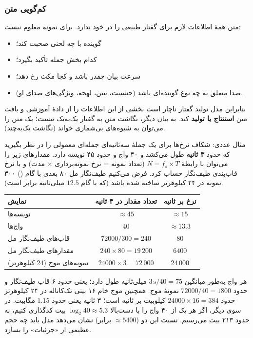 \subsubsection{کم‌گویی متن}
متن همهٔ اطلاعات لازم برای گفتار طبیعی را در خود ندارد. برای نمونه معلوم نیست:
\begin{itemize}
  \item گوینده با چه لحنی صحبت کند؛
  \item کدام بخش جمله تأکید بگیرد؛
  \item سرعت بیان چقدر باشد و کجا مکث رخ دهد؛
  \item صدا متعلق به چه نوع گوینده‌ای باشد (جنسیت، سن، لهجه، ویژگی‌های صدای او).
\end{itemize}
بنابراین مدل تولید گفتار ناچار است بخشی از این اطلاعات را از دادهٔ آموزشی و بافت متن \textbf{استنتاج یا تولید} کند. به بیان دیگر، نگاشت متن به گفتار یک‌به‌یک نیست؛ یک متن را می‌توان به شیوه‌های بی‌شماری خواند (نگاشت یک‌به‌چند).

\begin{addedbox}{مثال عددی: شکاف نرخ‌ها برای یک جملهٔ سه‌ثانیه‌ای}
جمله‌ای معمولی را در نظر بگیرید که حدود \textbf{۳ ثانیه} طول می‌کشد و ۴۰ واج و حدود ۴۵ نویسه دارد. مقدارهای زیر را می‌توان با رابطهٔ $N = f_s \times T$ (تعداد نمونه = نرخ نمونه‌برداری × مدت) و با نرخ قاب‌بندی طیف‌نگار حساب کرد. فرض می‌کنیم طیف‌نگار مل ۸۰ بعدی با گام () ۳۰۰ نمونه در ۲۴ کیلوهرتز ساخته شده باشد (که با گام $12.5$ میلی‌ثانیه برابر است).
\begin{center}
\begin{tabular}{lcc}
\toprule
نمایش & تعداد مقدار در ۳ ثانیه & نرخ بر ثانیه \\
\midrule
نویسه‌ها & $\approx 45$ & $\approx 15$ \\
واج‌ها & $40$ & $\approx 13.3$ \\
قاب‌های طیف‌نگار مل & $72000/300 = 240$ & $80$ \\
مقدارهای طیف‌نگار مل & $240 \times 80 = 19\,200$ & $6400$ \\
نمونه‌های موج ($24$ کیلوهرتز) & $24000 \times 3 = 72\,000$ & $24\,000$ \\
\bottomrule
\end{tabular}
\end{center}
هر واج به‌طور میانگین $3\,\text{s}/40 = 75$ میلی‌ثانیه طول دارد؛ یعنی حدود ۶ قاب طیف‌نگار و حدود $72000/40 = 1800$ نمونهٔ موج. همچنین موج خام ۱۶ بیتی تک‌کاناله در ۲۴ کیلوهرتز حدود $24000 \times 16 = 384$ کیلوبیت بر ثانیه است؛ ۳ ثانیه یعنی حدود $1.15$ مگابیت. در سوی دیگر، اگر هر یک از ۴۰ واج را با دست‌بالا $\log_2 40 \approx 5.3$ بیت کدگذاری کنیم، به حدود ۲۱۳ بیت می‌رسیم. نسبت این دو ($\approx 5400$ برابر) نشان می‌دهد مدل باید چه حجم عظیمی از «جزئیات» را بسازد.
\end{addedbox}

